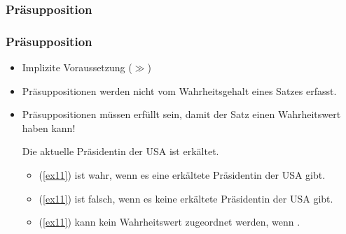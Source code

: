 
%
%	
%
%
%
%


%
\subsubsection{Präsupposition}
%

\begin{frame}
\frametitle{Präsupposition}

\begin{itemize}
	\item Implizite Voraussetzung ($\gg$)
	\item Präsuppositionen werden nicht vom Wahrheitsgehalt eines Satzes erfasst.
	\item Präsuppositionen müssen erfüllt sein, damit der Satz einen Wahrheitswert haben kann!

\vspace{1ex}

		\ea \label{ex11} Die aktuelle Präsidentin der USA ist erkältet.
		\z
		
		\begin{itemize}
			\item (\ref{ex11}) ist wahr, wenn es eine erkältete Präsidentin der USA gibt.
			\item (\ref{ex11}) ist falsch, wenn es keine erkältete Präsidentin der USA gibt.
			\item (\ref{ex11}) kann kein Wahrheitswert zugeordnet werden, wenn .
		\end{itemize}
	
\end{itemize}

\end{frame}



